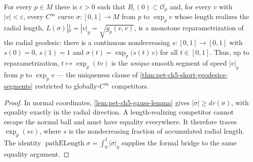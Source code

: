 \begin{lemma}
  \label{lem:pet-ch5-radial-geodesic-unique}
  \leanok
  For every $p\in M$ there is $\varepsilon>0$ such that $B_\varepsilon(0)\subset
  \mathcal O_p$ and, for every $v$ with $|v|<\varepsilon$, every $C^\infty$ curve
  $\sigma:[0,1]\to M$ from $p$ to $\exp_p v$ whose length realizes the radial
  length, $L(\sigma)|_0^1=|v|_g=\sqrt{g_p(v,v)}$, is a monotone reparametrization
  of the radial geodesic: there is a continuous nondecreasing $s:[0,1]\to[0,1]$
  with $s(0)=0$, $s(1)=1$ and $\sigma(t)=\exp_p\bigl(s(t)\,v\bigr)$ for all
  $t\in[0,1]$. Thus, up to reparametrization, $t\mapsto\exp_p(tv)$ is the
  \emph{unique} smooth segment of speed $|v|_g$ from $p$ to $\exp_p v$ — the
  uniqueness clause of \cref{thm:pet-ch5-short-geodesics-segments} restricted to
  globally-$C^\infty$ competitors.
\end{lemma}
\begin{proof}
  \leanok
  \sketch
  In normal coordinates, \cref{lem:pet-ch5-gauss-lemma} gives
  $|\dot\sigma|\ge dr(\dot\sigma)$, with equality exactly in the radial direction.
  A length-realizing competitor cannot escape the normal ball and must have
  equality everywhere.  It therefore traces $\exp_p(sv)$, where $s$ is the
  nondecreasing fraction of accumulated radial length.  The identity
  $\operatorname{pathELength}\sigma=\int_0^1|\dot\sigma|_g$ supplies the formal
  bridge to the same equality argument.
\end{proof}

